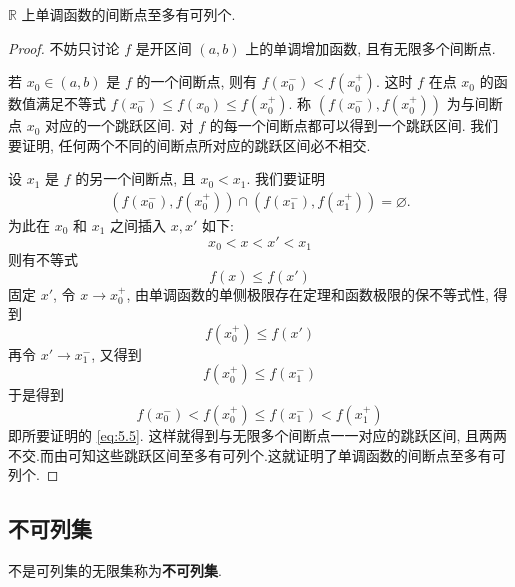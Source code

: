 \documentclass[../../main.tex]{subfiles}
\begin{document}
\begin{proposition}\label{proposition:实轴上单调函数至多有可列个间断点}
$\mathbb{R}$ 上单调函数的间断点至多有可列个.
\end{proposition}
\begin{proof}
不妨只讨论 \( f \) 是开区间 \( (a,b) \) 上的单调增加函数, 且有无限多个间断点.

若 \( x_0 \in (a,b) \) 是 \( f \) 的一个间断点, 则有 \( f(x_0^-) < f(x_0^+) \). 这时 \( f \) 在点 \( x_0 \) 的函数值满足不等式 \( f(x_0^-) \leqslant f(x_0) \leqslant f(x_0^+) \). 称 \( (f(x_0^-), f(x_0^+)) \) 为与间断点 \( x_0 \) 对应的一个跳跃区间.
对 \( f \) 的每一个间断点都可以得到一个跳跃区间. 我们要证明, 任何两个不同的间断点所对应的跳跃区间必不相交.

设 \( x_1 \) 是 \( f \) 的另一个间断点, 且 \( x_0 < x_1 \). 我们要证明
\begin{align} \label{eq:5.5}
(f(x_0^-), f(x_0^+)) \cap (f(x_1^-), f(x_1^+)) = \varnothing.
\end{align}
为此在 \( x_0 \) 和 \( x_1 \) 之间插入 \( x, x' \) 如下:
\[
x_0 < x < x' < x_1
\]
则有不等式
\[
f(x) \leqslant f(x')
\]
固定 \( x' \), 令 \( x \to x_0^+ \), 由单调函数的单侧极限存在定理和函数极限的保不等式性, 得到
\[
f(x_0^+) \leqslant f(x')
\]
再令 \( x' \to x_1^- \), 又得到
\[
f(x_0^+) \leqslant f(x_1^-)
\]
于是得到
\[
f(x_0^-) < f(x_0^+) \leqslant f(x_1^-) < f(x_1^+)
\]
即所要证明的 \eqref{eq:5.5}.
这样就得到与无限多个间断点一一对应的跳跃区间, 且两两不交.而由可知这些跳跃区间至多有可列个.这就证明了单调函数的间断点至多有可列个.
\end{proof}



\subsection{不可列集}

\begin{definition}[不可列集]
不是可列集的无限集称为\textbf{不可列集}.
\end{definition}
\end{document}
